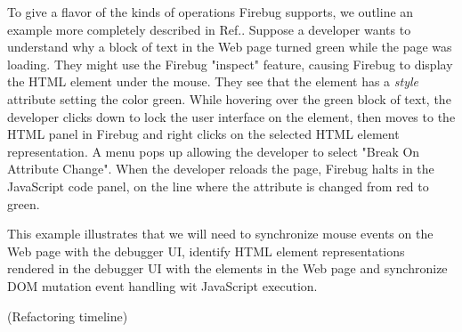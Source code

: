 To give a flavor of the kinds of operations Firebug supports, we outline  an example more completely
described in Ref.\cite{jjb-www2010}. Suppose a developer wants to understand why a block of text 
in the Web page turned green while the page was loading. They might use the Firebug "inspect" feature, 
causing Firebug to display the HTML element under the mouse. They see that the element has a \textit{style}
attribute setting the color green. While hovering over the green block of text, 
the developer clicks down to lock
the user interface on the element, then moves to the HTML panel in Firebug and right clicks on the 
selected HTML element representation. A menu pops up allowing the developer to select "Break On Attribute Change". 
When the developer reloads the page, Firebug halts in the JavaScript code panel, on the line where 
the attribute is changed from red to green.

This example illustrates that we will need to synchronize mouse events on the Web page with the debugger UI,
identify HTML element representations rendered in the debugger UI with the elements in the Web page and synchronize
DOM mutation event handling wit JavaScript execution.


(Refactoring timeline)